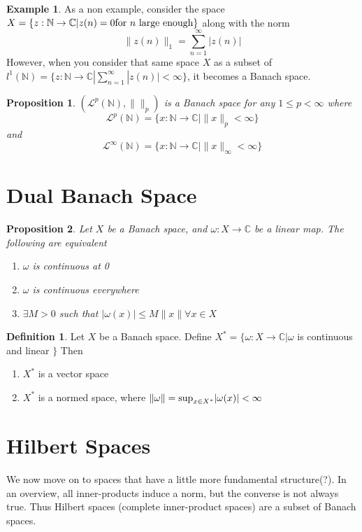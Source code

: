 \documentclass[12pt]{book}
\newtheorem{proposition}{Proposition}[section]
\theoremstyle{definition}
\newtheorem*{defn}{Definition}
\newtheorem{eg}{Example}[chapter]
\begin{document}
\begin{eg}
    As a non example, consider the space $X = \{z: \mathbb{N} \to \mathbb{C} | z(n) = 0 \textnormal{for $n$ large enough}\}$ along with the norm $$\|z(n)\|_1 = \sum_{n = 1}^{\infty} |z(n)|$$
    However, when you consider that same space $X$ as a subset of $l^1(\mathbb{N}) = \{z: \mathbb{N} \to \mathbb{C} | \sum_{n=1}^{\infty} |z(n)| < \infty\}$, it becomes a Banach space.
\end{eg}
\begin{proposition}
    $(\mathcal{L}^p(\mathbb{N}), \|\|_p)$ is a Banach space for any $1 \leq p <\infty$ where $$\mathcal{L}^p(\mathbb{N}) = \{x: \mathbb{N} \to \mathbb{C} | \|x\|_p < \infty \}$$
    and $$\mathcal{L}^{\infty}(\mathbb{N}) = \{x: \mathbb{N} \to \mathbb{C} | \|x\|_{\infty} < \infty \}$$
\end{proposition}
\section{Dual Banach Space}
\begin{proposition}
    Let $X$ be a Banach space, and $\omega: X \to \mathbb{C}$ be a linear map. The following are equivalent \begin{enumerate}
        \item $\omega$ is continuous at 0
        \item $\omega$ is continuous everywhere
        \item $\exists M > 0$ such that $|\omega(x)| \leq M\|x\| \forall x \in X$
    \end{enumerate}
\end{proposition}
\begin{defn}
    Let $X$ be a Banach space. Define $X^* = \{ \omega: X \to \mathbb{C} | \omega$ is continuous and linear $\}$ Then 
    \begin{enumerate}
        \item $X^*$ is a vector space
        \item $X^*$ is a normed space, where $\|\omega\| = \textnormal{sup}_{x \in X^*} |\omega(x)| < \infty$
    \end{enumerate}
\end{defn}
\section{Hilbert Spaces}
We now move on to spaces that have a little more fundamental structure(?). In an overview, all inner-products induce a norm, but the converse is not always true. Thus Hilbert spaces (complete inner-product spaces) are a subset of Banach spaces. 
\end{document}
